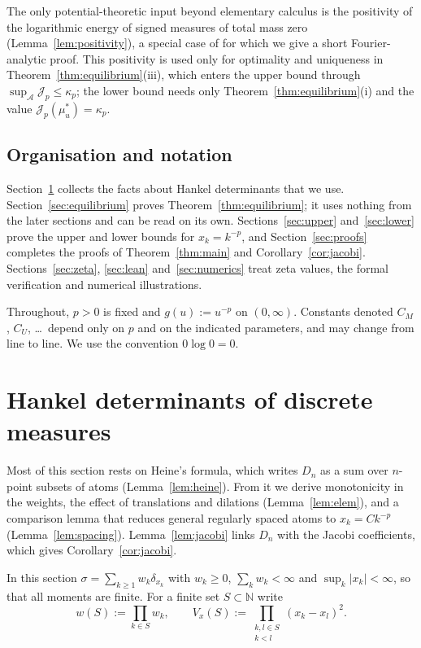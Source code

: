\documentclass{amsart}
\theoremstyle{definition}
\theoremstyle{remark}
\numberwithin{equation}{section}
\newcommand{\N}{\mathbb{N}}
\newcommand{\cA}{\mathcal{A}}
\newcommand{\cJ}{\mathcal{J}}
\begin{document}
The only potential-theoretic input beyond elementary calculus is the positivity of the logarithmic energy of
signed measures of total mass zero (Lemma~\ref{lem:positivity}), a special case of \cite[Lemma~2.1]{BKMW} for which we
give a short Fourier-analytic proof. This positivity is used only for optimality and uniqueness in
Theorem~\ref{thm:equilibrium}(iii), which enters the upper bound through $\sup_\cA\cJ_p\le\kappa_p$; the lower bound
needs only Theorem~\ref{thm:equilibrium}(i) and the value $\cJ_p(\mu^*_u)=\kappa_p$.

\subsection{Organisation and notation}
Section~\ref{sec:prelim} collects the facts about Hankel determinants that we use. Section~\ref{sec:equilibrium}
proves Theorem~\ref{thm:equilibrium}; it uses nothing from the later sections and can be read on its own.
Sections~\ref{sec:upper} and~\ref{sec:lower} prove the upper and lower bounds for $x_k=k^{-p}$, and
Section~\ref{sec:proofs} completes the proofs of Theorem~\ref{thm:main} and Corollary~\ref{cor:jacobi}.
Sections~\ref{sec:zeta}, \ref{sec:lean} and~\ref{sec:numerics} treat zeta values, the formal verification and
numerical illustrations.

Throughout, $p>0$ is fixed and $g(u):=u^{-p}$ on $(0,\infty)$. Constants denoted $C_M$, $C_U$, \dots\ depend only on
$p$ and on the indicated parameters, and may change from line to line. We use the convention $0\log0=0$.

\section{Hankel determinants of discrete measures}\label{sec:prelim}

Most of this section rests on Heine's formula, which writes $D_n$ as a sum over $n$-point subsets of atoms
(Lemma~\ref{lem:heine}). From it we derive monotonicity in the weights, the
effect of translations and dilations (Lemma~\ref{lem:elem}), and a comparison lemma that reduces general regularly
spaced atoms to $x_k=Ck^{-p}$ (Lemma~\ref{lem:spacing}).
Lemma~\ref{lem:jacobi} links $D_n$ with the Jacobi coefficients, which gives Corollary~\ref{cor:jacobi}.

In this section $\sigma=\sum_{k\ge1}w_k\delta_{x_k}$ with $w_k\ge0$, $\sum_kw_k<\infty$ and $\sup_k|x_k|<\infty$, so
that all moments are finite. For a finite set $S\subset\N$ write
\[
  w(S):=\prod_{k\in S}w_k,\qquad V_x(S):=\prod_{\substack{k,l\in S\\k<l}}(x_k-x_l)^2 .
\]
\end{document}
